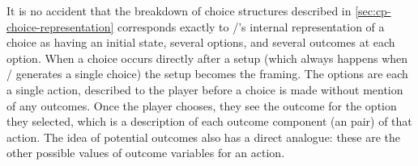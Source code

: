 It is no accident that the breakdown of choice structures described in \cref{sec:cp-choice-representation} corresponds exactly to \dunyazad/'s internal representation of a choice as having an initial state, several options, and several outcomes at each option.
%
When a choice occurs directly after a setup (which always happens when \dunyazad/ generates a single choice) the setup becomes the framing.
%
The options are each a single action, described to the player before a choice is made without mention of any outcomes.
%
Once the player chooses, they see the outcome for the option they selected, which is a description of each outcome component (an  pair) of that action.
%
The idea of potential outcomes also has a direct analogue: these are the other possible values of outcome variables for an action.


